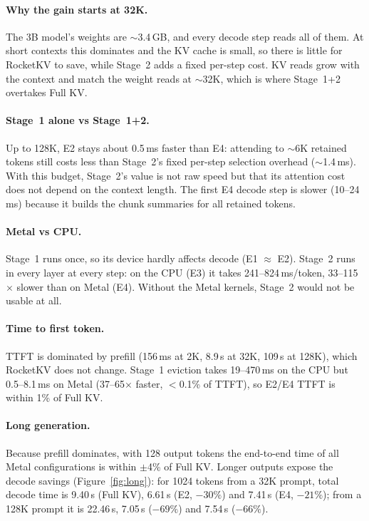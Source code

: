 \documentclass[10pt,letterpaper]{article}
\begin{document}
\paragraph{Why the gain starts at 32K.}
The 3B model's weights are $\sim$3.4\,GB, and every decode step reads all of them. At short contexts this dominates and the KV cache is small, so there is little for RocketKV to save, while Stage~2 adds a fixed per-step cost. KV reads grow with the context and match the weight reads at $\sim$32K, which is where Stage~1+2 overtakes Full KV.

\paragraph{Stage~1 alone vs Stage~1+2.}
Up to 128K, E2 stays about 0.5\,ms faster than E4: attending to $\sim$6K retained tokens still costs less than Stage~2's fixed per-step selection overhead ($\sim$1.4\,ms). With this budget, Stage~2's value is not raw speed but that its attention cost does not depend on the context length. The first E4 decode step is slower (10--24\,ms) because it builds the chunk summaries for all retained tokens.

\paragraph{Metal vs CPU.}
Stage~1 runs once, so its device hardly affects decode (E1 $\approx$ E2). Stage~2 runs in every layer at every step: on the CPU (E3) it takes 241--824\,ms/token, 33--115$\times$ slower than on Metal (E4). Without the Metal kernels, Stage~2 would not be usable at all.

\paragraph{Time to first token.}
TTFT is dominated by prefill (156\,ms at 2K, 8.9\,s at 32K, 109\,s at 128K), which RocketKV does not change. Stage~1 eviction takes 19--470\,ms on the CPU but 0.5--8.1\,ms on Metal (37--65$\times$ faster, $<$0.1\% of TTFT), so E2/E4 TTFT is within 1\% of Full KV.

\paragraph{Long generation.}
Because prefill dominates, with 128 output tokens the end-to-end time of all Metal configurations is within $\pm$4\% of Full KV. Longer outputs expose the decode savings (Figure~\ref{fig:long}): for 1024 tokens from a 32K prompt, total decode time is 9.40\,s (Full KV), 6.61\,s (E2, $-30\%$) and 7.41\,s (E4, $-21\%$); from a 128K prompt it is 22.46\,s, 7.05\,s ($-69\%$) and 7.54\,s ($-66\%$).
\end{document}

